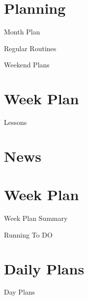 \documentclass[]{beamer}
\begin{document}
\section{Planning}
\begin{frame}{Month Plan}

\end{frame}
\begin{frame}{Regular Routines}

\end{frame}
\begin{frame}{Weekend Plans}

\end{frame}

\section{Week Plan}
 
\begin{frame}{Lessons} 
\end{frame}
\section{News}

%

\section{Week Plan}
\begin{markdown}
\begin{frame}{Week Plan Summary}
\end{frame}
\end{markdown}

\begin{markdown}
\begin{frame}[allowframebreaks]{Running To DO}
\end{frame}
\end{markdown}

\section{Daily Plans}
\begin{markdown} 
\begin{frame}{Day Plans}
\end{frame} 
\end{markdown}
\end{document}
